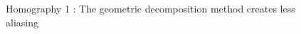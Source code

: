 \begin{figure}
\caption{Homography 1 : The geometric decomposition method creates less aliasing}
\label{Homo1}
\end{figure}

